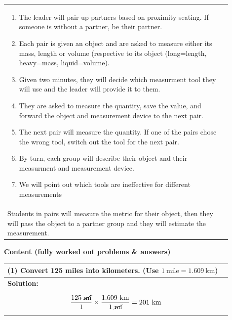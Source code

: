 \documentclass{article}
\begin{document}
\begin{tabular}{|p{0.9\linewidth}|}
\hline

\vspace{0.2cm}
\begin{enumerate}
    \item The leader will pair up partners based on proximity seating. If someone is without a partner, be their partner.
    \item Each pair is given an object and are asked to measure either its mass, length or volume (respective to its object (long=length, heavy=mass, liquid=volume).
    \item Given two minutes, they will decide which measurment tool they will use and the leader will provide it to them.
    \item They are asked to measure the quantity, save the value, and forward the object and measurement device to the next pair.
    \item The next pair will measure the quantity. If one of the pairs chose the wrong tool, switch out the tool for the next pair.
    \item By turn, each group will describe their object and their measurment and measurement device.
    \item We will point out which tools are ineffective for different measurements
\end{enumerate} \\[0.5em]
Students in pairs will measure the metric for their object, then they will pass the object to a partner group and they will estimate the measurement. \\
\hline
\end{tabular}
\newpage

\noindent
{\large \textbf{Content (fully worked out problems \& answers)}} \\[0.2em]

\begin{tabular}{|p{0.9\linewidth}|}
\hline
\vspace{0.2cm}

\textbf{(1)} Convert 125 miles into kilometers. (Use $1~\text{mile} = 1.609~\text{km}$) \\
\hline
\textbf{Solution:} \\
\[
\frac{125~\cancel{\text{mi}}}{1} \times \frac{1.609~\text{km}}{1~\cancel{\text{mi}}}
= 201~\text{km}
\] \\
\hline
\end{tabular}
\newpage
\end{document}
